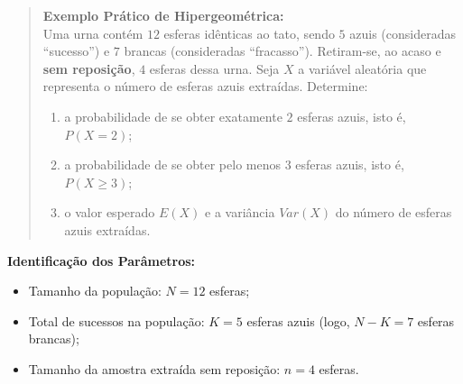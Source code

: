 \begin{quote}
\textbf{Exemplo Prático de Hipergeométrica:} \\
Uma urna contém $12$ esferas idênticas ao tato, sendo $5$ azuis (consideradas ``sucesso'') e $7$ brancas (consideradas ``fracasso''). Retiram-se, ao acaso e \textbf{sem reposição}, $4$ esferas dessa urna. Seja $X$ a variável aleatória que representa o número de esferas azuis extraídas. Determine:
\begin{enumerate}
    \item[a)] a probabilidade de se obter exatamente $2$ esferas azuis, isto é, $P(X = 2)$;
    \item[b)] a probabilidade de se obter pelo menos $3$ esferas azuis, isto é, $P(X \ge 3)$;
    \item[c)] o valor esperado $E(X)$ e a variância $Var(X)$ do número de esferas azuis extraídas.
\end{enumerate}
\end{quote}

\textbf{Identificação dos Parâmetros:}
\begin{itemize}
    \item Tamanho da população: $N = 12$ esferas;
    \item Total de sucessos na população: $K = 5$ esferas azuis (logo, $N - K = 7$ esferas brancas);
    \item Tamanho da amostra extraída sem reposição: $n = 4$ esferas.
\end{itemize}

